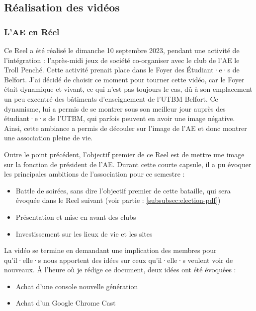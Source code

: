 \subsection{Réalisation des vidéos}\label{subsec:realisation-des-videos}

\subsubsection{L'\gls{AE} en Réel}\label{subsubsec:ae-en-reel}

Ce Reel a été réalisé le dimanche 10 septembre 2023, pendant une activité de l'intégration : l'après-midi jeux de société co-organiser avec le club de l'\gls{AE} le Troll Penché.
Cette activité prenait place dans le Foyer des Étudiant·e·s de Belfort.
J'ai décidé de choisir ce moment pour tourner cette vidéo, car le Foyer était dynamique et vivant, ce qui n'est pas toujours le cas, dû à son emplacement un peu excentré des bâtiments d'enseignement de l'\gls{UTBM} Belfort.
Ce dynamisme, lui a permis de se montrer sous son meilleur jour auprès des étudiant·e·s de l'\gls{UTBM}, qui parfois peuvent en avoir une image négative.
Ainsi, cette ambiance a permis de découler sur l'image de l'\gls{AE} et donc montrer une association pleine de vie.

Outre le point précédent, l'objectif premier de ce Reel est de mettre une image sur la fonction de président de l'\gls{AE}.
Durant cette courte capsule, il a pu évoquer les principales ambitions de l'association pour ce semestre :
\begin{itemize}
    \item Battle de soirées, sans dire l'objectif premier de cette bataille, qui sera évoquée dans le Reel suivant (voir partie : \ref{subsubsec:election-pdf})
    \item Présentation et mise en avant des clubs
    \item Investissement sur les lieux de vie et les sites
\end{itemize}


La vidéo se termine en demandant une implication des membres pour qu'il·elle·s nous apportent des idées sur ceux qu'il·elle·s veulent voir de nouveaux.
À l'heure où je rédige ce document, deux idées ont été évoquées :
\begin{itemize}
    \item Achat d'une console nouvelle génération
    \item Achat d'un Google Chrome Cast
\end{itemize}

